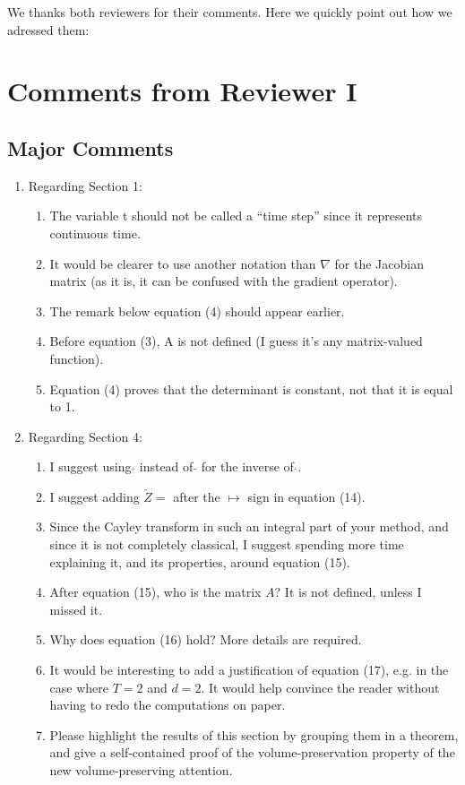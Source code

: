 \documentclass{article}
\begin{document}
We thanks both reviewers for their comments. Here we quickly point out how we adressed them:

\section{Comments from Reviewer I}

\subsection*{Major Comments}
\begin{enumerate}
\item Regarding Section 1:
\begin{enumerate}
\item The variable t should not be called a ``time step'' since it represents continuous time.
\item It would be clearer to use another notation than $\nabla$ for the Jacobian matrix (as it is, it can be confused with the gradient operator).
\item The remark below equation (4) should appear earlier.
\item Before equation (3), A is not defined (I guess it's any matrix-valued function).
\item Equation (4) proves that the determinant is constant, not that it is equal to 1.
\end{enumerate}
\item Regarding Section 4:
\begin{enumerate}
\item I suggest using $\check{}$ instead of $\tilde{}$ for the inverse of $\hat{}$.
\item I suggest adding $\check{Z} =$ after the $\mapsto$ sign in equation (14).
\item Since the Cayley transform in such an integral part of your method, and since it is not completely classical, I suggest spending more time explaining it, and its properties, around equation (15).
\item After equation (15), who is the matrix $A$? It is not defined, unless I missed it.
\item Why does equation (16) hold? More details are required.
\item It would be interesting to add a justification of equation (17), e.g. in the case where $T = 2$ and $d = 2$. It would help convince the reader without having to redo the computations on paper.
\item Please highlight the results of this section by grouping them in a theorem, and give a self-contained proof of the volume-preservation property of the new volume-preserving attention.
\end{enumerate}
\end{enumerate}
\end{document}

